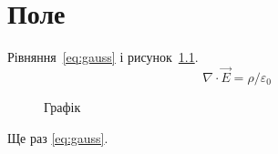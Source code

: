 \chapter{Поле}\label{ch:field}
Рівняння~\eqref{eq:gauss} і рисунок~\ref{fig:plot}.
\begin{equation}
  \nabla\cdot\vec E = \rho/\varepsilon_0 \label{eq:gauss}
\end{equation}
\begin{figure}
  \caption{Графік}\label{fig:plot}
\end{figure}
Ще раз \ref{eq:gauss}.
